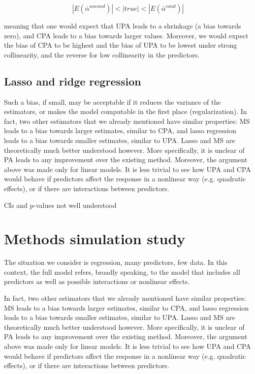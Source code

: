 \documentclass[5p]{elsarticle}
\begin{document}
\begin{equation}
 |E(\bar{\alpha}^{uncond}) | < | true | < | E(\bar{\alpha}^{cond}) | 
\label{eq: averaged parameters }
\end{equation}

meaning that one would expect that UPA leads to a shrinkage (a bias towards zero), and CPA leads to a bias towards larger values. Moreover, we would expect the bias of CPA to be highest and the bias of UPA to be lowest under strong collinearity, and the reverse for low collinearity in the predictors.  

\subsection{Lasso and ridge regression}

Such a bias, if small, may be acceptable if it reduces the variance of the estimators, or makes the model computable in the first place (regularization). In fact, two other estimators that we already mentioned have similar properties: MS leads to a bias towards larger estimates, similar to CPA, and lasso regression leads to a bias towards smaller estimates, similar to UPA. Lasso and MS are theoretically much better understood however. More specifically, it is unclear of PA leads to any improvement over the existing method. Moreover, the argument above was made only for linear models. It is less trivial to see how UPA and CPA would behave if predictors affect the response in a nonlinear way (e.g. quadratic effects), or if there are interactions between predictors. 

CIs and p-values not well understood \citep{Javanmard-Confidenceintervalsand-2014}






\section{Methods simulation study}


The situation we consider is regression, many predictors, few data. In this context, the full model refers, broadly speaking, to the model that includes all predictors as well as possible interactions or nonlinear effects. 


In fact, two other estimators that we already mentioned have similar properties: MS leads to a bias towards larger estimates, similar to CPA, and lasso regression leads to a bias towards smaller estimates, similar to UPA. Lasso and MS are theoretically much better understood however. More specifically, it is unclear of PA leads to any improvement over the existing method. Moreover, the argument above was made only for linear models. It is less trivial to see how UPA and CPA would behave if predictors affect the response in a nonlinear way (e.g. quadratic effects), or if there are interactions between predictors. 
\end{document}
